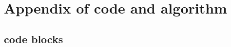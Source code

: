 \documentclass[11pt,twoside]{article}
\begin{document}


\newpage

\newpage

\newpage

\newpage



\newpage
{}




\newpage
\setcounter{page}{1}
\fancyfoot[C]{- \thepage\space-}
\appendix
\section{Appendix of code and algorithm}
\subsection{code blocks}


\end{document}
